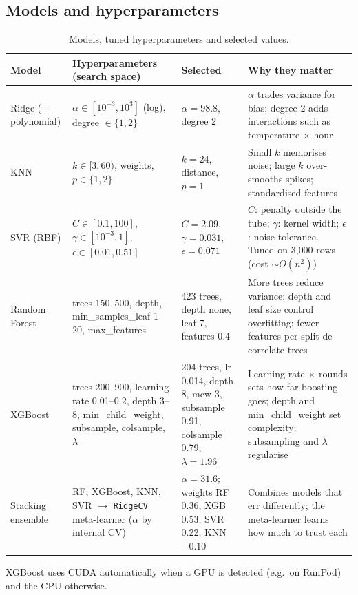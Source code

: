 \documentclass[11pt,a4paper]{article}
\begin{document}
\subsection{Models and hyperparameters}
\begin{table}[H]
\centering\small
\caption{Models, tuned hyperparameters and selected values.}
\label{tab:models}
\begin{tabularx}{\textwidth}{L{2.4cm}L{4.5cm}L{3.5cm}Y}
\toprule
Model & Hyperparameters (search space) & Selected & Why they matter \\
\midrule
Ridge (+ polynomial) & $\alpha \in [10^{-3},10^{3}]$ (log), degree $\in\{1,2\}$ & $\alpha=98.8$, degree 2 & $\alpha$ trades variance for bias; degree 2 adds interactions such as temperature $\times$ hour \\
KNN & $k\in[3,60)$, weights, $p\in\{1,2\}$ & $k=24$, distance, $p=1$ & Small $k$ memorises noise; large $k$ over-smooths spikes; standardised features \\
SVR (RBF) & $C\in[0.1,100]$, $\gamma\in[10^{-3},1]$, $\epsilon\in[0.01,0.51]$ & $C=2.09$, $\gamma=0.031$, $\epsilon=0.071$ & $C$: penalty outside the tube; $\gamma$: kernel width; $\epsilon$: noise tolerance. Tuned on 3{,}000 rows (cost $\sim O(n^2)$) \\
Random Forest & trees 150--500, depth, min\_samples\_leaf 1--20, max\_features & 423 trees, depth none, leaf 7, features 0.4 & More trees reduce variance; depth and leaf size control overfitting; fewer features per split de-correlate trees \\
XGBoost & trees 200--900, learning rate 0.01--0.2, depth 3--8, min\_child\_weight, subsample, colsample, $\lambda$ & 204 trees, lr 0.014, depth 8, mcw 3, subsample 0.91, colsample 0.79, $\lambda=1.96$ & Learning rate $\times$ rounds sets how far boosting goes; depth and min\_child\_weight set complexity; subsampling and $\lambda$ regularise \\
Stacking ensemble & RF, XGBoost, KNN, SVR $\rightarrow$ \texttt{RidgeCV} meta-learner ($\alpha$ by internal CV) & $\alpha=31.6$; weights RF 0.36, XGB 0.53, SVR 0.22, KNN $-0.10$ & Combines models that err differently; the meta-learner learns how much to trust each \\
\bottomrule
\end{tabularx}
\end{table}

XGBoost uses CUDA automatically when a GPU is detected (e.g.\ on RunPod) and the CPU otherwise.
\end{document}
